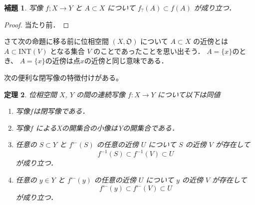 \documentclass[leqno, a4paper, 12pt]{jsarticle}
\newtheorem{thm}{定理}
\newtheorem{lem}[thm]{補題}
\newcommand{\nai}{\mathrm{INT}}
\newcommand{\myinv}[1]{#1^{\gets}}
\newcommand{\mysm}[1]{#1_{?}}
\begin{document}
\begin{lem}\label{lem:inc}
写像
$f;X\to Y$
と
$A\subset X$
について
$\mysm{f}(A)\subset f(A)$
が成り立つ．
\end{lem}
\begin{proof}
当たり前．
\end{proof}





さて次の命題に移る前に位相空間
$(X,\mathfrak{O})$
について
$A\subset X$
の近傍とは
$A\subset \nai (V)$
となる集合
$V$
のことであったことを思い出そう．
$A=\{x\}$のとき、
$A=\{x\}$の近傍は点$x$の近傍と同じ意味である．

次の便利な閉写像の特徴付けがある。
\begin{thm}\label{thm:characlosed}
位相空間
$X$, 
$Y$
の間の連続写像
$f:X\to  Y$
について以下は同値
\begin{enumerate}[label=\textup{(\arabic*)}]
\item
写像$f$は閉写像である．
\item 
写像$f$
によるXの開集合の小像はYの開集合である．
\item\label{item:used}
任意の
$S\subset  Y$
と
$\myinv{f}(S)$
の任意の近傍
$U$
について
$S$
の近傍
$V$
が存在して
\[
f^{-1}(S)\subset f^{-1}(V)\subset U
\]
が成り立つ．
\item\label{item:used2}
任意の
$y\in Y$
と
$\myinv{f}(y)$
の任意の近傍
$U$
について
$y$
の近傍
$V$
が存在して
\[
\myinv{f}(y)\subset \myinv{f}(V)\subset U
\]
が成り立つ．
\end{enumerate}
\end{thm}
\end{document}
